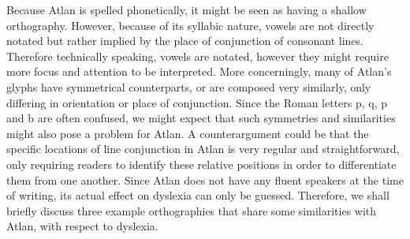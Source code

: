 Because Atlan is spelled phonetically, it might be seen as having a shallow orthography. However, because of its syllabic nature, vowels are not directly notated but rather implied by the place of conjunction of consonant lines. Therefore technically speaking, vowels are notated, however they might require more focus and attention to be interpreted. More concerningly, many of Atlan’s glyphs have symmetrical counterparts, or are composed very similarly, only differing in orientation or place of conjunction. Since the Roman letters p, q, p and b are often confused, we might expect that such symmetries and similarities might also pose a problem for Atlan. A counterargument could be that the specific locations of line conjunction in Atlan is very regular and straightforward, only requiring readers to identify these relative positions in order to differentiate them from one another. Since Atlan does not have any fluent speakers at the time of writing, its actual effect on dyslexia can only be guessed. Therefore, we shall briefly discuss three example orthographies that share some similarities with Atlan, with respect to dyslexia. 

\def\isy#1{\scalerel*{\texttt{[image: ./Images/\#1.jpg]}}{X}}

